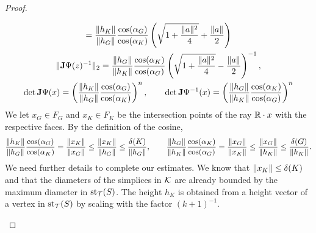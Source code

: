 \documentclass[10pt,a4paper]{article}
\begin{document}
\begin{proof}
\begin{itemize}
\begin{gather*}
            = 
            \frac{ \| h_K \| }{ \| h_{{G}} \| }
            \frac{ \cos(\alpha_{{G}}) }{ \cos(\alpha_K) }
            \left( 
                \sqrt{ 1 + \frac{ \|a\|^{2} }{ 4 } } + \frac{ \|a\| }{2}
            \right)
            \\
            \|  {\mathbf{J}}\Psi(z)^{-1}  \|_{2}
            = 
            \frac{ \| h_{{G}} \| }{ \| h_K \| }
            \frac{ \cos(\alpha_K) }{ \cos(\alpha_{{G}}) }
            \left( 
                \sqrt{ 1 + \frac{ \|a\|^{2} }{ 4 } } - \frac{ \|a\| }{2}
            \right)^{-1},
            \\
            \det{\mathbf{J}}\Psi(x)
            =
            \left( 
            \frac{ \| h_K \| }{ \| h_{{G}} \| }
            \frac{ \cos(\alpha_{{G}}) }{ \cos(\alpha_K) }
            \right)^{n},
            \qquad
            \det{\mathbf{J}}\Psi^{-1}(x)
            =
            \left( 
            \frac{ \| h_{{G}} \| }{ \| h_{K} \| }
            \frac{ \cos(\alpha_{K}) }{ \cos(\alpha_{{G}}) }
            \right)^{n}
        \end{gather*}
        We let $x_{G} \in F_{G}$ and $x_{K} \in F_{K}$ be the intersection points of the ray ${\mathbb R} \cdot x$ with the respective faces.
        By the definition of the cosine, 
        \begin{align*}
            \frac{ \| h_K \| }{ \| h_{{G}} \| }
            \frac{ \cos(\alpha_{{G}}) }{ \cos(\alpha_K) }
            = 
            \frac{ \| x_K \| }{ \| x_{{G}} \| }
            \leq 
            \frac{ \| x_K \| }{ \| h_{{G}} \| }
            \leq 
            \frac{ {\delta}(K) }{ \| h_{{G}} \| }
            ,
            \qquad 
            \frac{ \| h_{{G}} \| }{ \| h_K \| }
            \frac{ \cos(\alpha_K) }{ \cos(\alpha_{{G}}) }
            = 
            \frac{ \| x_{G} \| }{ \| x_{K} \| }
            \leq 
            \frac{ \| x_{G} \| }{ \| h_{K} \| }
            \leq 
            \frac{ {\delta}(G) }{ \| h_{K} \| }
            .
        \end{align*}
        We need further details to complete our estimates. 
        We know that $\| x_K \| \leq {\delta}(K)$ and that the diameters of the simplices in ${\mathcal K}$ are already bounded by the maximum diameter in $\operatorname{st}_{{\mathcal T}}(S)$. The height $h_{K}$ is obtained from a height vector of a vertex in $\operatorname{st}_{{\mathcal T}}(S)$ by scaling with the factor $(k+1)^{-1}$.

\end{itemize}
\end{proof}
\end{document}
